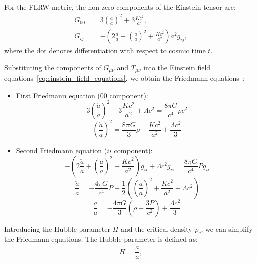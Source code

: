 For the FLRW metric, the non-zero components of the Einstein tensor are:
\begin{align}
    G_{00} &= 3\left( \frac{\dot{a}}{a} \right)^{2} + 3\frac{K c^2}{a^2}, \label{eq:G00_component} \\
    G_{ij} &= -\left( 2\frac{\ddot{a}}{a} + \left( \frac{\dot{a}}{a} \right)^2 + \frac{K c^2}{a^2} \right) a^2 g_{ij}, \label{eq:Gij_component}
\end{align}
where the dot denotes differentiation with respect to cosmic time \( t \).

Substituting the components of \( G_{\mu\nu} \) and \( T_{\mu\nu} \) into the Einstein field equations~\eqref{eq:einstein_field_equations}, we obtain the Friedmann equations~\citep{1922ZPhy...10..377F}:
\begin{itemize}
    \item First Friedmann equation ($00$ component):
    \begin{equation}
        3 \left( \frac{\dot{a}}{a} \right)^2 + 3\frac{Kc^2}{a^2} + \Lambda c^2 = \frac{8\pi G}{c^4} \rho c^2
    \end{equation}
    \begin{equation}
        \left( \frac{\dot{a}}{a} \right)^2 = \frac{8\pi G}{3} \rho - \frac{Kc^2}{a^2} + \frac{\Lambda c^2}{3}
        \label{eq:friedmann_first}
    \end{equation}
    \item Second Friedmann equation ($ii$ component):
    \begin{equation}
        -\left(2\frac{\ddot{a}}{a} + \left( \frac{\dot{a}}{a} \right)^2 + \frac{Kc^2}{a^2}\right)g_{ii} + \Lambda c^2 g_{ii} = \frac{8\pi G}{c^4} P g_{ii}
    \end{equation}
    \begin{equation}
        \frac{\ddot{a}}{a} = -\frac{4\pi G}{c^4} P - \frac{1}{2} \left(\left( \frac{\dot{a}}{a} \right)^2 
            + \frac{Kc^2}{a^2} - \Lambda c^2 \right)
    \end{equation}
    \begin{equation}
        \frac{\ddot{a}}{a} = -\frac{4\pi G}{3} \left( \rho + \frac{3P}{c^2} \right) + \frac{\Lambda c^2}{3}
        \label{eq:friedmann_second}
    \end{equation}
\end{itemize}
Introducing the Hubble parameter \( H \) and the critical density \( \rho_c \), we can simplify the Friedmann equations. The Hubble parameter is defined as:
\begin{equation}
    H = \frac{\dot{a}}{a},
    \label{eq:hubble_parameter}
\end{equation}

